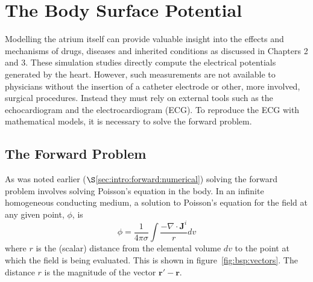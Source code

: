 \chapter{The Body Surface Potential}
\label{chapter:bsp}

Modelling the atrium itself can provide valuable insight into the effects and
mechanisms of drugs, diseases and inherited conditions as discussed in Chapters 2 and 3.
These simulation studies directly compute the electrical potentials generated by the heart.
However, such measurements are not available to physicians without the
insertion of a catheter electrode or other, more involved, surgical procedures.
Instead they must rely on external tools such as the echocardiogram and the
electrocardiogram (ECG).
To reproduce the ECG with mathematical models, it is necessary to solve the forward problem.

\section{The Forward Problem}

As was noted earlier ($\S$\ref{sec:intro:forward:numerical}) solving the forward
problem involves solving Poisson's equation in the body.
In an infinite homogeneous conducting medium, a solution to Poisson's equation
for the field at any given point, $\phi$, is~\cite{Plonsey1989}
\begin{equation}
\label{eqn:bsp:infinite}
\phi = \frac{1}{4 \pi \sigma} \int \frac{- \nabla \cdot
\mathbf{J}^{i} }{r} dv
\end{equation}
where $r$ is the (scalar) distance from the elemental volume $dv$ to the point at
which the field is being evaluated.
This is shown in figure~\ref{fig:bsp:vectors}.
The distance $r$ is the magnitude of the vector $\mathbf{r'}-\mathbf{r}$.


